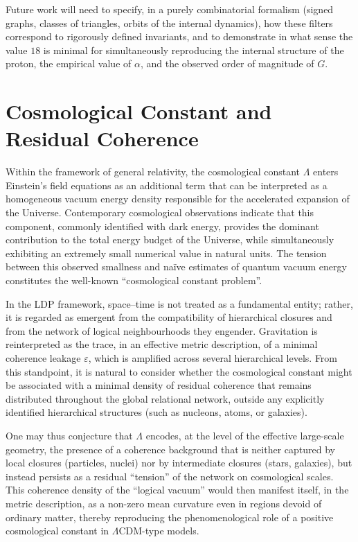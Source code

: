 \documentclass[11pt,a4paper]{article}
\begin{document}
Future work will need to specify, in a purely combinatorial formalism (signed graphs, classes of triangles, orbits of the internal dynamics), how these filters correspond to rigorously defined invariants, and to demonstrate in what sense the value \(18\) is minimal for simultaneously reproducing the internal structure of the proton, the empirical value of \(\alpha\), and the observed order of magnitude of \(G\).

\section{Cosmological Constant and Residual Coherence}

Within the framework of general relativity, the cosmological constant \(\Lambda\) enters Einstein’s field equations as an additional term that can be interpreted as a homogeneous vacuum energy density responsible for the accelerated expansion of the Universe. Contemporary cosmological observations indicate that this component, commonly identified with dark energy, provides the dominant contribution to the total energy budget of the Universe, while simultaneously exhibiting an extremely small numerical value in natural units. The tension between this observed smallness and naïve estimates of quantum vacuum energy constitutes the well-known “cosmological constant problem”.

In the LDP framework, space–time is not treated as a fundamental entity; rather, it is regarded as emergent from the compatibility of hierarchical closures and from the network of logical neighbourhoods they engender. Gravitation is reinterpreted as the trace, in an effective metric description, of a minimal coherence leakage \(\varepsilon\), which is amplified across several hierarchical levels. From this standpoint, it is natural to consider whether the cosmological constant might be associated with a minimal density of residual coherence that remains distributed throughout the global relational network, outside any explicitly identified hierarchical structures (such as nucleons, atoms, or galaxies).

One may thus conjecture that \(\Lambda\) encodes, at the level of the effective large-scale geometry, the presence of a coherence background that is neither captured by local closures (particles, nuclei) nor by intermediate closures (stars, galaxies), but instead persists as a residual “tension” of the network on cosmological scales. This coherence density of the “logical vacuum” would then manifest itself, in the metric description, as a non-zero mean curvature even in regions devoid of ordinary matter, thereby reproducing the phenomenological role of a positive cosmological constant in \(\Lambda\)CDM-type models.
\end{document}
